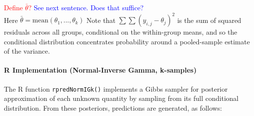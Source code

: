 \documentclass[12pt, a4paper]{article}
\begin{document}
\textcolor{red}{Define $\bar{\theta}$?} \textcolor{blue}{See next sentence.  Does that suffice?}\\

\noindent Here $\bar{\theta} = \text{mean}(\theta_1,...,\theta_k)$ Note that $\sum\sum\left(y_{i,j}-\theta_j\right)^2$ is the sum of squared residuals across all groups, conditional on the within-group means, and so the conditional distribution concentrates probability around a pooled-sample estimate of the variance.


      \paragraph{R Implementation (Normal-Inverse Gamma, k-samples)}

      The R function \texttt{rpredNormIGk()} implements a Gibbs sampler for posterior approximation of each unknown quantity by sampling from its full conditional distribution.  From these posteriors, predictions are generated, as follows:
\end{document}
